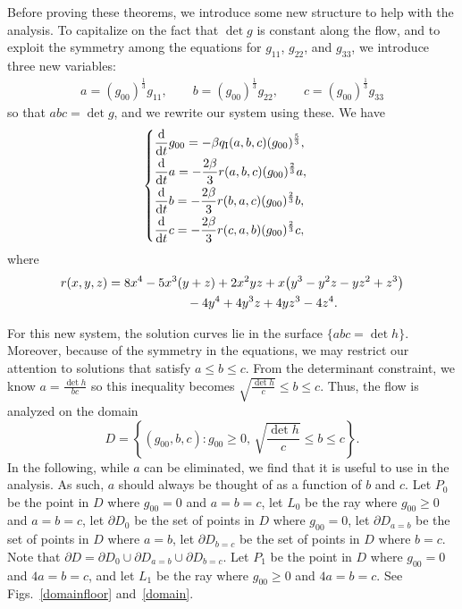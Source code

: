 \documentclass[pdftex]{sigma}
\numberwithin{equation}{section}
\newcommand{\dtime}{\frac{{\rm d}}{{\rm d} t}} %
\begin{document}
Before proving these theorems, we introduce some new structure to help with the analysis. To capitalize on the fact that $\det g$ is constant along the flow, and to exploit the symmetry among the equations for $g_{11}$, $g_{22}$, and $g_{33}$, we introduce three new variables:
\begin{gather*}
a = (g_{00})^{\frac{1}{3}} g_{11}, \qquad
b = (g_{00})^{\frac{1}{3}} g_{22}, \qquad
c = (g_{00})^{\frac{1}{3}} g_{33}
\end{gather*}
so that $abc = \det g$, and we rewrite our system using these.
We have
\begin{gather} \label{s3abcsystem}
\begin{cases}
\displaystyle \dtime g_{00} = -\beta q_{\rm I}(a, b, c) (g_{00})^{\frac{5}{3}}, \vspace{1mm}\\
\displaystyle \dtime a = -\frac{2 \beta}{3} r(a, b, c) (g_{00})^{\frac{2}{3}} a,\vspace{1mm} \\
\displaystyle \dtime b = -\frac{2 \beta}{3} r(b, a, c) (g_{00})^{\frac{2}{3}}b, \vspace{1mm}\\
\displaystyle \dtime c = -\frac{2 \beta}{3} r(c, a, b) (g_{00})^{\frac{2}{3}}c,
\end{cases}
\end{gather}
where
\begin{gather*}
r(x, y, z) = 8x^4 - 5x^3(y + z) + 2x^2yz
+ x\big(y^3 - y^2z - yz^2 + z^3\big) \\
\hphantom{r(x, y, z) =}{}
 -4y^4 + 4y^3z + 4yz^3 - 4z^4.
\end{gather*}

For this new system, the solution curves lie in the surface $\{a b c = \det h\}$. Moreover, because of the symmetry in the equations, we may restrict our attention to solutions that satisfy $a \leq b \leq c$.
From the determinant constraint, we know $a = \frac{\det h}{bc}$ so this inequality becomes $\sqrt{\frac{\det h}{c}} \leq b \leq c$.
Thus, the flow is analyzed on the domain
\[
D = \left\{ (g_{00}, b, c)\colon g_{00} \geq 0,\, \sqrt{\frac{\det h}{c}} \leq b \leq c \right\}.
\]
In the following, while $a$ can be eliminated, we find that it is useful to use in the analysis. As such, $a$ should always be thought of as a function of $b$ and $c$. Let $P_0$ be the point in $D$ where $g_{00} = 0$ and $a = b = c$, let $L_0$ be the ray where $g_{00} \geq 0$ and $a = b = c$, let $\partial D_0$ be the set of points in $D$ where $g_{00} = 0$, let $\partial D_{a = b}$ be the set of points in $D$ where $a = b$, let $\partial D_{b = c}$ be the set of points in $D$ where $b = c$. Note that $\partial D = \partial D_0 \cup \partial D_{a = b} \cup \partial D_{b = c}$. Let $P_1$ be the point in $D$ where $g_{00} = 0$ and $4a = b = c$, and let $L_1$ be the ray where $g_{00} \geq 0$ and $4a = b = c$. See Figs.~\ref{domainfloor} and~\ref{domain}.
\end{document}
